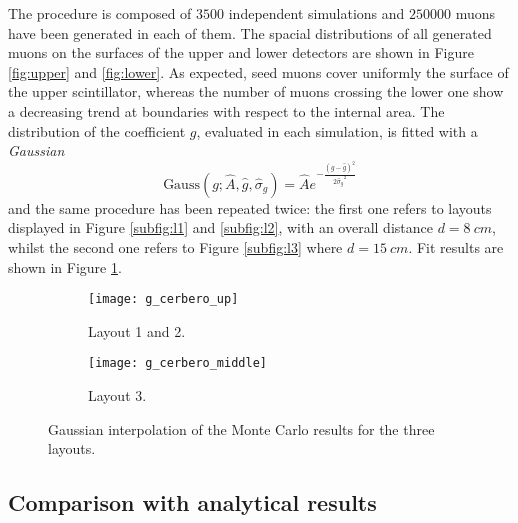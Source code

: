 The procedure is composed of $3500$ independent simulations and $250000$ muons have been generated in each of them. The spacial distributions of all generated muons on the surfaces of the upper and lower detectors are shown in Figure \ref{fig:upper} and \ref{fig:lower}. As expected, seed muons cover uniformly the surface of the upper scintillator, whereas the number of muons crossing the lower one show a decreasing trend at boundaries with respect to the internal area.
The distribution of the coefficient $g$, evaluated in each simulation, is fitted with a \emph{Gaussian}
\begin{equation}
\textrm{Gauss}(g;  \hat A , \hat g, \hat \sigma_{g})= \hat A e^{-\frac{(g -\hat g)^2}{2 {\hat \sigma_{g}}^2}}
\end{equation}
and the same procedure has been repeated twice: the first one refers to layouts displayed in Figure \ref{subfig:l1} and \ref{subfig:l2}, with an overall distance $d=\SI{8}{cm}$, whilst the second one refers to Figure \ref{subfig:l3} where $d=\SI{15}{cm}$. Fit results are shown in Figure \ref{fig:geom_eff}.

\begin{figure}[!htp]
	\centering
	\begin{subfigure}{.5\textwidth}
		\centering
		\texttt{[image: g\_cerbero\_up]}
		\caption{Layout 1 and 2.}
	\end{subfigure}\hfill
	\begin{subfigure}{.5\textwidth}
		\centering
		\texttt{[image: g\_cerbero\_middle]}
		\caption{Layout 3.}
	\end{subfigure}
	\caption{Gaussian interpolation of the Monte Carlo results for the three layouts.}
	\label{fig:geom_eff}
\end{figure} 

\subsection{Comparison with analytical results}

